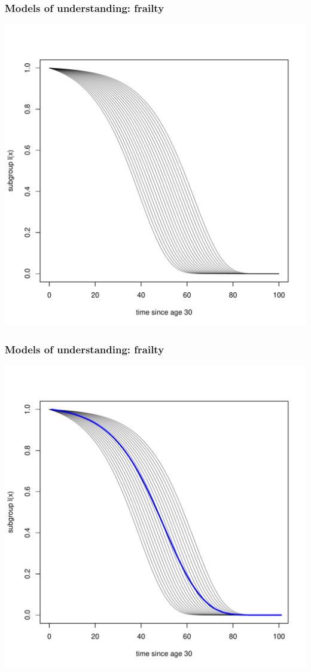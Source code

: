 \documentclass[20pt]{beamer}
\begin{document}
\begin{frame}
\frametitle{Models of understanding: frailty}
\vspace{-2em}
\begin{center}
\includegraphics{Figures/Frailty3.pdf}
\end{center}
\end{frame}

\begin{frame}
\frametitle{Models of understanding: frailty}
\vspace{-2em}
\begin{center}
\includegraphics{Figures/Frailty4.pdf}
\end{center}
\end{frame}
\end{document}
